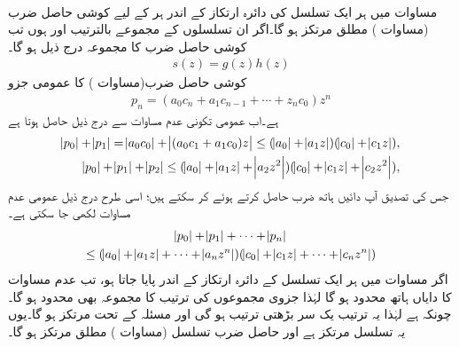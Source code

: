 \quad {}\\
مساوات  میں ہر ایک تسلسل کی دائرہ ارتکاز کے اندر ہر  کے لیے کوشی حاصل ضرب  (مساوات ) مطلق مرتکز ہو گا۔اگر ان تسلسلوں کے مجموعے بالترتیب  اور  ہوں تب کوشی حاصل ضرب کا مجموعہ درج ذیل ہو گا۔
\begin{align}\label{مساوات_ٹیلر_کوشی_حاصل_ضرب_پ}
s(z)=g(z)h(z)
\end{align}
\quad
کوشی حاصل ضرب(مساوات ) کا عمومی جزو 
\begin{align*}
p_n=(a_0c_n+a_1c_{n-1}+\cdots+z_nc_0)z^n
\end{align*}
ہے۔اب عمومی تکونی عدم مساوات  سے درج ذیل حاصل ہوتا ہے
\begin{align*}
\abs{p_0}+\abs{p_1}=\abs{a_0c_0}+\abs{(a_0c_1+a_1c_0)z}\le (\abs{a_0}+\abs{a_1z})(\abs{c_0}+\abs{c_1z}),\\
\abs{p_0}+\abs{p_1}+\abs{p_2}\le (\abs{a_0}+\abs{a_1z}+\abs{a_2z^2})(\abs{c_0}+\abs{c_1z}+\abs{c_2z^2}),
\end{align*}
جس کی تصدیق آپ دائیں ہاتھ ضرب حاصل کرتے ہوئے کر سکتے ہیں؛ اسی طرح درج ذیل عمومی عدم مساوات لکھی جا سکتی ہے۔
\begin{multline}\label{مساوات_ٹیلر_کوشی_حاصل_ضرب_ت}
\abs{p_0}+\abs{p_1}+\cdots+\abs{p_n}\\
\le (\abs{a_0}+\abs{a_1z}+\cdots+\abs{a_nz^n})(\abs{c_0}+\abs{c_1z}+\cdots+\abs{c_nz^n})
\end{multline} 
اگر   مساوات  میں ہر ایک تسلسل کے دائرہ ارتکاز کے اندر پایا جاتا ہو، تب  عدم مساوات  کا دایاں ہاتھ محدود ہو گا لہٰذا جزوی مجموعوں کی ترتیب کا مجموعہ   بھی محدود ہو گا۔چونکہ  ہے لہٰذا یہ ترتیب یک سر بڑھتی ترتیب ہو گی اور  مسئلہ   کے تحت مرتکز ہو گا۔یوں یہ تسلسل مرتکز ہے اور حاصل ضرب تسلسل (مساوات ) مطلق مرتکز ہو گا۔ 

